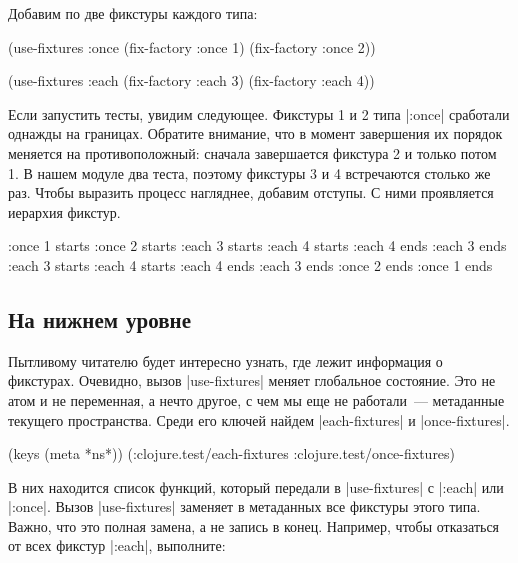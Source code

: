 Добавим по две фикстуры каждого типа:

\begin{english}
  \begin{clojure}
(use-fixtures :once
  (fix-factory :once 1)
  (fix-factory :once 2))

(use-fixtures :each
  (fix-factory :each 3)
  (fix-factory :each 4))
  \end{clojure}
\end{english}

Если запустить тесты, увидим следующее. Фикстуры 1 и 2 типа \spverb|:once|
сработали однажды на границах. Обратите внимание, что в момент завершения их
порядок меняется на противоположный: сначала завершается фикстура 2 и только
потом 1. В нашем модуле два теста, поэтому фикстуры 3 и 4 встречаются столько же
раз. Чтобы выразить процесс нагляднее, добавим отступы. С ними проявляется
иерархия фикстур.

\begin{english}
  \begin{clojure}
:once 1 starts
  :once 2 starts
    :each 3 starts
      :each 4 starts
      :each 4 ends
    :each 3 ends
    :each 3 starts
      :each 4 starts
      :each 4 ends
    :each 3 ends
  :once 2 ends
:once 1 ends
  \end{clojure}
\end{english}

\subsection{На нижнем уровне}

Пытливому читателю будет интересно узнать, где лежит информация о
фикстурах. Очевидно, вызов \spverb|use-fixtures| меняет глобальное
состояние. Это не атом и не переменная, а нечто другое, с чем мы еще не
работали~--- метаданные текущего пространства. Среди его ключей найдем
\spverb|each-fixtures| и \spverb|once-fixtures|.

\begin{english}
  \begin{clojure}
(keys (meta *ns*))
(:clojure.test/each-fixtures :clojure.test/once-fixtures)
  \end{clojure}
\end{english}

В них находится список функций, который передали в \spverb|use-fixtures| с
\spverb|:each| или \spverb|:once|. Вызов \spverb|use-fixtures| заменяет в
метаданных все фикстуры этого типа. Важно, что это полная замена, а не запись в
конец. Например, чтобы отказаться от всех фикстур \spverb|:each|, выполните:

